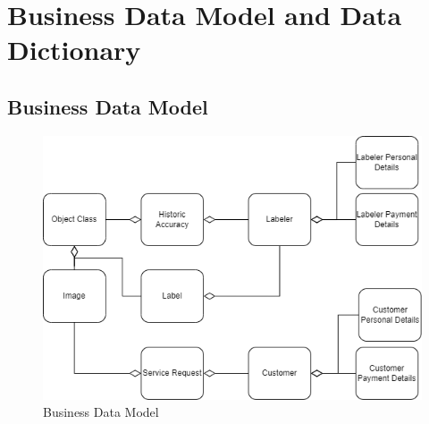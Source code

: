 \documentclass[12pt]{article}
\begin{document}
\section{Business Data Model and Data Dictionary}
\subsection{Business Data Model}
\begin{figure}[H]
\includegraphics[scale=0.75]{businessDataModel.png}
\caption{Business Data Model}
    \label{fig:usecase}
\end{figure}
\end{document}

